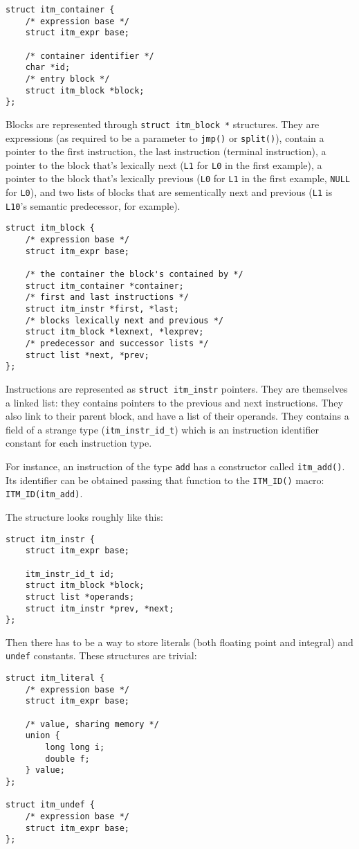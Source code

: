 \documentclass[12pt, a4paper]{article}
\begin{document}
\begin{lstlisting}
struct itm_container {
	/* expression base */
	struct itm_expr base;

	/* container identifier */
	char *id;
	/* entry block */
	struct itm_block *block;
};
\end{lstlisting}

Blocks are represented through \verb+struct itm_block *+ structures. They are
expressions (as required to be a parameter to \verb+jmp()+ or \verb+split()+),
contain a pointer to the first instruction, the last instruction (terminal
instruction), a pointer to the block that's lexically next (\verb+L1+ for
\verb+L0+ in the first example), a pointer to the block that's lexically previous
(\verb+L0+ for \verb+L1+ in the first example, \verb+NULL+ for \verb+L0+),
and two lists of blocks that are sementically next and previous (\verb+L1+ is
\verb+L10+'s semantic predecessor, for example).

\begin{lstlisting}
struct itm_block {
	/* expression base */
	struct itm_expr base;

	/* the container the block's contained by */
	struct itm_container *container;
	/* first and last instructions */
	struct itm_instr *first, *last;
	/* blocks lexically next and previous */
	struct itm_block *lexnext, *lexprev;
	/* predecessor and successor lists */
	struct list *next, *prev;
};
\end{lstlisting}

Instructions are represented as \verb+struct itm_instr+ pointers. They are
themselves a linked list: they contains pointers to the previous and next
instructions. They also link to their parent block, and have a list of their
operands. They contains a field of a strange type (\verb+itm_instr_id_t+) which
is an instruction identifier constant for each instruction type.

For instance, an instruction of the type \verb+add+ has a constructor called
\verb+itm_add()+. Its identifier can be obtained passing that function to the
\verb+ITM_ID()+ macro: \verb+ITM_ID(itm_add)+.

The structure looks roughly like this:

\begin{lstlisting}
struct itm_instr {
	struct itm_expr base;

	itm_instr_id_t id;
	struct itm_block *block;
	struct list *operands;
	struct itm_instr *prev, *next;
};
\end{lstlisting}

Then there has to be a way to store literals (both floating point and integral)
and \verb+undef+ constants. These structures are trivial:

\begin{lstlisting}
struct itm_literal {
	/* expression base */
	struct itm_expr base;

	/* value, sharing memory */
	union {
		long long i;
		double f;
	} value;
};

struct itm_undef {
	/* expression base */
	struct itm_expr base;
};
\end{lstlisting}
\end{document}
